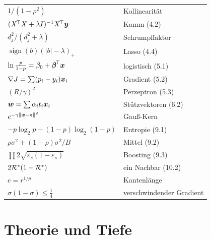 \begin{merksatz}
\begin{center}
{\small
\renewcommand{\arraystretch}{1.62}
\begin{tabular}{@{}P{4.4cm}P{4.2cm}@{}}
\toprule
$1/(1-\rho^{2})$ & Kollinearität\\
$(X^{\!\top}X+\lambda I)^{-1}X^{\!\top}\boldsymbol{y}$ & Kamm (4.2)\\
$d_j^{2}/(d_j^{2}+\lambda)$ & Schrumpffaktor\\
$\operatorname{sign}(b)(|b|-\lambda)_{+}$ & Lasso (4.4)\\
$\ln\frac{p}{1-p} = \beta_0 + \boldsymbol{\beta}^{\!\top}\boldsymbol{x}$ & logistisch (5.1)\\
$\nabla J = \sum(p_i-y_i)\boldsymbol{x}_i$ & Gradient (5.2)\\
$(R/\gamma)^{2}$ & Perzeptron (5.3)\\
$\boldsymbol{w} = \sum\alpha_i t_i\boldsymbol{x}_i$ & Stützvektoren (6.2)\\
$e^{-\gamma\|\boldsymbol{x}-\boldsymbol{z}\|^{2}}$ & Gauß-Kern\\
$-p\log_2p - (1-p)\log_2(1-p)$ & Entropie (9.1)\\
$\rho\sigma^{2} + (1-\rho)\sigma^{2}/B$ & Mittel (9.2)\\
$\prod 2\sqrt{\varepsilon_s(1-\varepsilon_s)}$ & Boosting (9.3)\\
$2\mathcal{R}^{*}(1-\mathcal{R}^{*})$ & ein Nachbar (10.2)\\
$e = r^{1/p}$ & Kantenlänge\\
$\sigma(1-\sigma) \le \tfrac14$ & verschwindender Gradient\\
\bottomrule
\end{tabular}}
\end{center}
\end{merksatz}

\section{Theorie und Tiefe}

